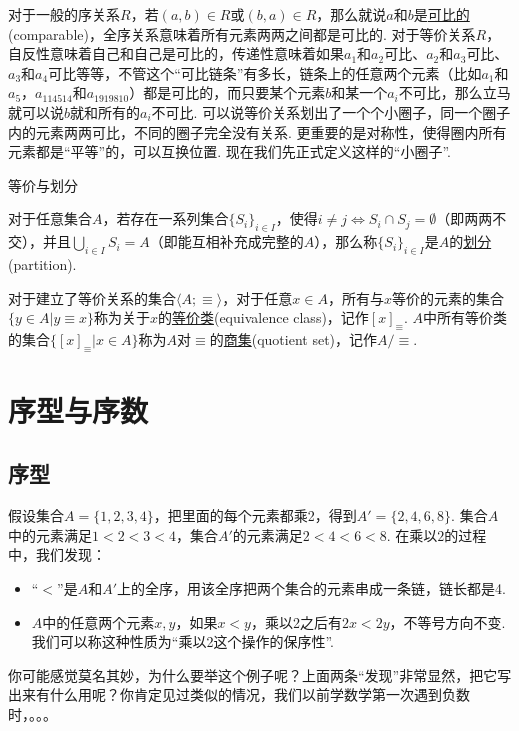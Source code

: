 \documentclass[main.tex]{subfiles}
\begin{document}
对于一般的序关系\(R\)，若\((a,b) \in R\)或\((b,a)\in R\)，那么就说\(a\)和\(b\)是\uline{可比的}(comparable)，全序关系意味着所有元素两两之间都是可比的. 对于等价关系\(R\)，自反性意味着自己和自己是可比的，传递性意味着如果\(a_1\)和\(a_2\)可比、\(a_2\)和\(a_3\)可比、\(a_3\)和\(a_4\)可比等等，不管这个“可比链条”有多长，链条上的任意两个元素（比如\(a_1\)和\(a_5\)，\(a_{114514}\)和\(a_{1919810}\)）都是可比的，而只要某个元素\(b\)和某一个\(a_i\)不可比，那么立马就可以说\(b\)就和所有的\(a_i\)不可比. 可以说等价关系划出了一个个小圈子，同一个圈子内的元素两两可比，不同的圈子完全没有关系. 更重要的是对称性，使得圈内所有元素都是“平等”的，可以互换位置. 现在我们先正式定义这样的“小圈子”.

\begin{definition}{等价与划分}
    \par
    对于任意集合\(A\)，若存在一系列集合\(\{S_i\}_{i \in I}\)，使得\(i \neq j \Leftrightarrow S_i \cap S_j = \emptyset\)（即两两不交），并且\(\displaystyle{\bigcup_{i \in I}S_i = A}\)（即能互相补充成完整的\(A\)），那么称\(\{S_i\}_{i \in I}\)是\(A\)的\uline{划分}(partition).
    \par
    对于建立了等价关系的集合\(\langle A; \equiv \rangle\)，对于任意\(x \in A\)，所有与\(x\)等价的元素的集合\(\{y\in A | y \equiv x\}\)称为关于\(x\)的\uline{等价类}(equivalence class)，记作\([x]_{\equiv}\). \(A\)中所有等价类的集合\(\{[x]_\equiv | x \in A\}\)称为\(A\)对\(\equiv\)的\uline{商集}(quotient set)，记作\(A/\equiv\).
\end{definition}


\section{序型与序数}

\subsection{序型}

假设集合\(A = \{1,2,3,4\}\)，把里面的每个元素都乘2，得到\(A' = \{2,4,6,8\}\). 集合\(A\)中的元素满足\(1<2<3<4\)，集合\(A'\)的元素满足\(2<4<6<8\). 在乘以\(2\)的过程中，我们发现：
\begin{itemize}
    \item “\(<\)”是\(A\)和\(A'\)上的全序，用该全序把两个集合的元素串成一条链，链长都是4.
    \item \(A\)中的任意两个元素\(x,y\)，如果\(x<y\)，乘以2之后有\(2x<2y\)，不等号方向不变. 我们可以称这种性质为“乘以2这个操作的保序性”.
\end{itemize}
你可能感觉莫名其妙，为什么要举这个例子呢？上面两条“发现”非常显然，把它写出来有什么用呢？你肯定见过类似的情况，我们以前学数学第一次遇到负数时，。。。
\end{document}
